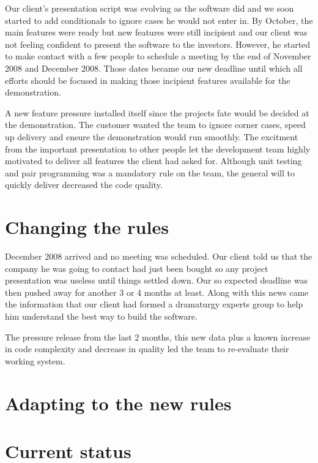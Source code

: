 \documentclass[lnbip]{svmultln}
\begin{document}
Our client's presentation script was evolving as the software did and
we soon started to add conditionals to ignore cases he would not enter
in. By October, the main features were ready but new features were
still incipient and our client was not feeling confident to present
the software to the investors. However, he started to make contact
with a few people to schedule a meeting by the end of November 2008
and December 2008. Those dates became our new deadline until which all
efforts should be focused in making those incipient features available
for the demonstration.

A new feature pressure installed itself since the projects fate would
be decided at the demonstration. The customer wanted the team to
ignore corner cases, speed up delivery and ensure the demonstration
would run smoothly. The excitment from the important presentation to
other people let the development team highly motivated to deliver all
features the client had asked for. Although unit testing and pair
programming was a mandatory rule on the team, the general will to
quickly deliver decreased the code quality.

\section{Changing the rules}
\label{sec:changes}

December 2008 arrived and no meeting was scheduled. Our client told us
that the company he was going to contact had just been bought so any
project presentation was useless until things settled down. Our so
expected deadline was then pushed away for another 3 or 4 months at
least. Along with this news came the information that our client had
formed a dramaturgy experts group to help him understand the best way
to build the software.

The pressure release from the last 2 months, this new data plus a
known increase in code complexity and decrease in quality led the
team to re-evaluate their working system.

\section{Adapting to the new rules}
\label{sec:adapting}

\section{Current status}
\label{sec:nowadays}
\end{document}
